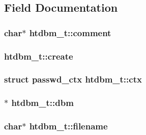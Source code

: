 \subsection{Field Documentation}
\subsubsection[{\texorpdfstring{comment}{comment}}]{\setlength{\rightskip}{0pt plus 5cm}char$\ast$ htdbm\+\_\+t\+::comment}\hypertarget{structhtdbm__t_ae1b3014537f8f3ed33889f2163a51b1a}{}\label{structhtdbm__t_ae1b3014537f8f3ed33889f2163a51b1a}
\subsubsection[{\texorpdfstring{create}{create}}]{ htdbm\+\_\+t\+::create}\hypertarget{structhtdbm__t_a02ef409d5c643c9c028c9ab5cf086621}{}\label{structhtdbm__t_a02ef409d5c643c9c028c9ab5cf086621}
\subsubsection[{\texorpdfstring{ctx}{ctx}}]{\setlength{\rightskip}{0pt plus 5cm}struct {\bf passwd\+\_\+ctx} htdbm\+\_\+t\+::ctx}\hypertarget{structhtdbm__t_af77f060240e0d260df642131cbe820ff}{}\label{structhtdbm__t_af77f060240e0d260df642131cbe820ff}
\subsubsection[{\texorpdfstring{dbm}{dbm}}]{$\ast$ htdbm\+\_\+t\+::dbm}\hypertarget{structhtdbm__t_ac8921880be36097eb9297df6f72962bc}{}\label{structhtdbm__t_ac8921880be36097eb9297df6f72962bc}
\subsubsection[{\texorpdfstring{filename}{filename}}]{\setlength{\rightskip}{0pt plus 5cm}char$\ast$ htdbm\+\_\+t\+::filename}\hypertarget{structhtdbm__t_ae236b5391f19a7ea30b90fbb0e5b9eab}{}\label{structhtdbm__t_ae236b5391f19a7ea30b90fbb0e5b9eab}
